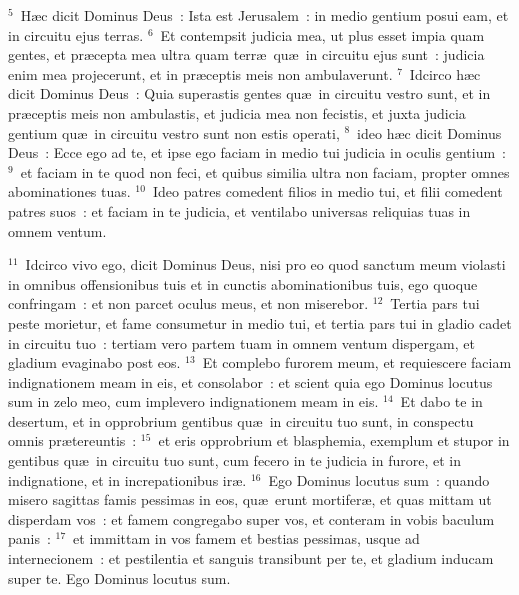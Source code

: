 ${}^{5}$~H\ae c dicit Dominus Deus~: Ista est Jerusalem~: in medio gentium posui eam, et in circuitu ejus terras.
${}^{6}$~Et contempsit judicia mea, ut plus esset impia quam gentes, et pr\ae cepta mea ultra quam terr\ae\ qu\ae\ in circuitu ejus sunt~: judicia enim mea projecerunt, et in pr\ae ceptis meis non ambulaverunt.
${}^{7}$~Idcirco h\ae c dicit Dominus Deus~: Quia superastis gentes qu\ae\ in circuitu vestro sunt, et in pr\ae ceptis meis non ambulastis, et judicia mea non fecistis, et juxta judicia gentium qu\ae\ in circuitu vestro sunt non estis operati,
${}^{8}$~ideo h\ae c dicit Dominus Deus~: Ecce ego ad te, et ipse ego faciam in medio tui judicia in oculis gentium~:
${}^{9}$~et faciam in te quod non feci, et quibus similia ultra non faciam, propter omnes abominationes tuas.
${}^{10}$~Ideo patres comedent filios in medio tui, et filii comedent patres suos~: et faciam in te judicia, et ventilabo universas reliquias tuas in omnem ventum.


${}^{11}$~Idcirco vivo ego, dicit Dominus Deus, nisi pro eo quod sanctum meum violasti in omnibus offensionibus tuis et in cunctis abominationibus tuis, ego quoque confringam~: et non parcet oculus meus, et non miserebor.
${}^{12}$~Tertia pars tui peste morietur, et fame consumetur in medio tui, et tertia pars tui in gladio cadet in circuitu tuo~: tertiam vero partem tuam in omnem ventum dispergam, et gladium evaginabo post eos.
${}^{13}$~Et complebo furorem meum, et requiescere faciam indignationem meam in eis, et consolabor~: et scient quia ego Dominus locutus sum in zelo meo, cum implevero indignationem meam in eis.
${}^{14}$~Et dabo te in desertum, et in opprobrium gentibus qu\ae\ in circuitu tuo sunt, in conspectu omnis pr\ae tereuntis~:
${}^{15}$~et eris opprobrium et blasphemia, exemplum et stupor in gentibus qu\ae\ in circuitu tuo sunt, cum fecero in te judicia in furore, et in indignatione, et in increpationibus ir\ae .
${}^{16}$~Ego Dominus locutus sum~: quando misero sagittas famis pessimas in eos, qu\ae\ erunt mortifer\ae , et quas mittam ut disperdam vos~: et famem congregabo super vos, et conteram in vobis baculum panis~:
${}^{17}$~et immittam in vos famem et bestias pessimas, usque ad internecionem~: et pestilentia et sanguis transibunt per te, et gladium inducam super te. Ego Dominus locutus sum.

